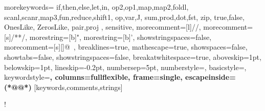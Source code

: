 \usepackage{todonotes}
\newcommand{\TODO}[1]{\todo[inline,author=TODO]{#1}}
\newcommand{\AS}[1]{\todo[inline,author=AS]{#1}}
\newcommand{\as}[1]{\todo[size=\tiny]{as: #1}{}}
\newcommand{\SSS}[1]{\todo[inline,author=SS]{#1}}
\newcommand{\sss}[1]{\todo[size=\tiny]{ss: #1}{}}
\newcommand{\EA}[1]{\todo[inline,author=EA]{#1}}
\newcommand{\ea}[1]{\todo[size=\tiny]{ea: #1}{}}
\newcommand{\MH}[1]{\todo[inline,author=MH]{#1}}
\newcommand{\mh}[1]{\todo[size=\tiny]{mh: #1}{}}
\newcommand{\YK}[1]{\todo[inline,author=YK]{#1}}
\newcommand{\yk}[1]{\todo[size=\tiny]{yk: #1}{}}

\usepackage{amsmath}
\usepackage{mathtools}
\usepackage{suffix}
\usepackage{tikz-cd}
\usepackage{mathpartir}
\usepackage{enumitem}
\usepackage{stmaryrd}
\usepackage[all]{xy}
\usepackage{twoopt}
\usepackage{array}
\usepackage{listings}
\usepackage{multirow, bigdelim}

%
{morekeywords={
  if,then,else,let,in,
  op2,op1,map,map2,foldl,
  scanl,scanr,map3,fun,reduce,shift1,
  op,var,J,
  sum,prod,dot,fst,
  zip,
  true,false,
  OnesLike,
  ZerosLike,
  pair,proj
  },%
  sensitive,%
  morecomment=[l]//,%
  morecomment=[s]{/*}{*/},%
  morestring=[b]",%
  morestring=[b]',%
  showstringspaces=false,%
  morecomment=[s][\color{gray}]{@}{\ },%
    breaklines=true,%
  mathescape=true,%
showspaces=false,
showtabs=false,
showstringspaces=false,
breakatwhitespace=true,
  aboveskip=1pt,
  belowskip=1pt,
  lineskip=-0.2pt,
   numbersep=5pt,
   numberstyle=\tiny\ttfamily,
   basicstyle=\small\ttfamily,
   keywordstyle=\bfseries\color{blue!70!black},%
   columns=fullflexible,
  frame=single,
  escapeinside={(*@}{@*)}
}[keywords,comments,strings]%

\lstset{language=llql}
\lstMakeShortInline[columns=fixed]!


\newcommand{\system}{RAD\xspace}
\newcommand{\dfsmooth}{$\text{d}\widetilde{\textsc{f}}$\xspace}
\newcommand{\supfull}{\CIRCLE}
\newcommand{\suphalf}{\LEFTcircle}
\newcommand{\supnone}{\Circle}
\newcommand{\supfullstar}{\hspace{1ex}\supfull*}
\newcommand{\notexists}{-}
\newcommand{\RR}{\mathbb{R}}

\newtheorem{notation}{Notation}
\newtheorem{remark}{Remark}

\newcommand{\code}[1]{\texttt{#1}}

\newcommand{\dif}{\mathop{}\!\mathrm{d}}
\newcommand{\Diff}{\mathbf{Diff}}
\newcommand{\sem}[1]{\llbracket #1\rrbracket}
\newcommand{\semgl}[1]{\llparenthesis #1\rrparenthesis}
\newcommand{\defeq}{\stackrel {\mathrm{def}}=}

